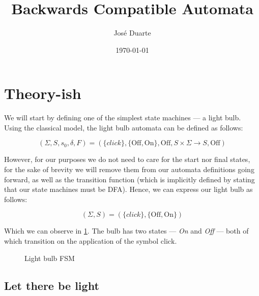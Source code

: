 \documentclass[a4paper]{article}
\begin{document}
\title{Backwards Compatible Automata}
\author{José Duarte}
\date{\today}
\maketitle

\section*{Theory-ish}

We will start by defining one of the simplest state machines — a light bulb.
Using the classical model, the light bulb automata can be defined as follows:

\begin{equation}
    (\Sigma, S, s_0, \delta, F) = (\{click\}, \{\text{Off}, \text{On}\}, \text{Off},S \times \Sigma \rightarrow S, \text{Off})
    \label{eq:fsm_long}
\end{equation}

However, for our purposes we do not need to care for the start nor final states,
for the sake of brevity we will remove them from our automata definitions going forward,
as well as the transition function (which is implicitly defined by stating that our state machines must be DFA).
Hence, we can express our light bulb as follows:

\begin{equation}
    (\Sigma, S) = (\{click\}, \{\text{Off}, \text{On}\})
    \label{eq:fsm_short}
\end{equation}

Which we can observe in \cref{fig:bulb_fsm}.
The bulb has two states — \emph{On} and \emph{Off} — both of which transition on the application of the symbol $\text{click}$.

\begin{figure}[ht]
    \centering
    \caption{Light bulb FSM}
    \label{fig:bulb_fsm}
\end{figure}

\subsection*{Let there be light}
\end{document}
